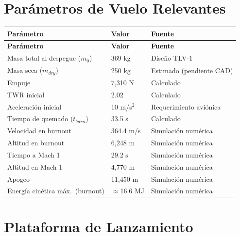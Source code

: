 \documentclass[11pt, a4paper]{article}
\begin{document}
\section{Par\'{a}metros de Vuelo Relevantes}

\begin{longtable}{L{5cm} C{3.5cm} L{5cm}}
  \color{white}\textbf{Par\'{a}metro} &
  \color{white}\textbf{Valor} &
  \color{white}\textbf{Fuente} \\
  \endfirsthead
  \color{white}\textbf{Par\'{a}metro} &
  \color{white}\textbf{Valor} &
  \color{white}\textbf{Fuente} \\
  \endhead
  Masa total al despegue ($m_0$)    & 369 kg          & Dise\~{n}o TLV-1 \\
  Masa seca ($m_{dry}$)             & 250 kg          & Estimado (pendiente CAD) \\
  Empuje                            & 7{,}310 N       & Calculado \\
  TWR inicial                       & 2.02            & Calculado \\
  Aceleraci\'{o}n inicial           & 10 m/s$^2$      & Requerimiento aviónica \\
  Tiempo de quemado ($t_{burn}$)    & 33.5 s          & Calculado \\
  Velocidad en burnout              & 364.4 m/s       & Simulaci\'{o}n num\'{e}rica \\
  Altitud en burnout                & 6{,}248 m       & Simulaci\'{o}n num\'{e}rica \\
  Tiempo a Mach 1                   & 29.2 s          & Simulaci\'{o}n num\'{e}rica \\
  Altitud en Mach 1                 & 4{,}770 m       & Simulaci\'{o}n num\'{e}rica \\
  Apogeo                           & 11{,}450 m      & Simulaci\'{o}n num\'{e}rica \\
  Energ\'{i}a cin\'{e}tica m\'{a}x.\ (burnout) & $\approx$16.6 MJ & Simulaci\'{o}n num\'{e}rica \\
\end{longtable}

\section{Plataforma de Lanzamiento}
\end{document}
